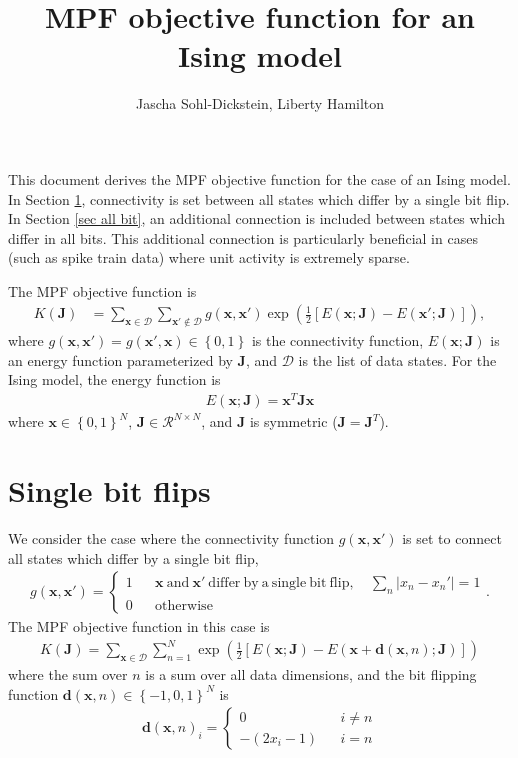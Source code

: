 \documentclass{article}
\title{MPF objective function for an Ising model}
\author{
Jascha Sohl-Dickstein, Liberty Hamilton
}
\newcommand{\mb}{\mathbf}
\begin{document}
\maketitle

This document derives the MPF objective function for the case of an Ising model.  In Section \ref{sec single bit}, connectivity is set between all states which differ by a single bit flip.  In Section \ref{sec all bit}, an additional connection is included between states which differ in all bits.  This additional connection is particularly beneficial in cases (such as spike train data) where unit activity is extremely sparse.

The MPF objective function is
\begin{align}
K\left( \mb J \right) & = \sum_{\mb x \in \mathcal D} \sum_{\mb x' \notin \mathcal D} g\left( \mb x, \mb x' \right) \exp\left( \frac{1}{2}\left[
E(\mb x; \mb J ) - E(\mb x'; \mb J) \right] \right)
,
\end{align}
where $g\left( \mb x, \mb x' \right) = g\left( \mb x', \mb x \right) \in \left\{ 0, 1 \right\}$ is the connectivity function, $E(\mb x; \mb J )$ is an energy function parameterized by $\mb J$, and $\mathcal D$ is the list of data states.  For the Ising model, the energy function is
\begin{align}
E\left( \mb x; \mb J\right) = \mb x^T \mb J \mb x
\end{align}
where $\mb x \in \left\{ 0, 1 \right\}^N$, $\mb J \in \mathcal R^{N\times N}$, and $\mb J$ is symmetric ($\mb J = \mb J^T$).

\section{Single bit flips}\label{sec single bit}

We consider the case where the connectivity function $g\left( \mb x, \mb x' \right)$ is set to connect all states which differ by a single bit flip,
\begin{align}
g\left( \mb x, \mb x' \right)
 =
	\left\{\begin{array}{ccrl}
1 & & \mb x \mathrm{\ and\ } \mb x' \mathrm{\ differ\ by\ a\ single\ bit\ flip,\ }  & \sum_n \left| x_n - x_n' \right| = 1  \\
0 & & \mathrm{otherwise} & 
	\end{array}\right.
\label{trans}
.
\end{align}
The MPF objective function in this case is
\begin{align}
K\left( \mb J \right) = \sum_{\mb x \in \mathcal D} \sum_{n=1}^N \exp\left( \frac{1}{2}\left[
E(\mb x; \mb J) - E(\mb x + {\mb d}(\mb x, n); \mb J) \right] \right)
\end{align}
where the sum over $n$ is a sum over all data dimensions, and the bit flipping function ${\mb d}(\mb x, n) \in \left\{ -1, 0, 1 \right\}^N$ is
\begin{align}
{\mb d}(\mb x, n)_i =
	\left\{\begin{array}{ccc}
0 & & i \neq n \\
-(2 x_i - 1) & & i = n
	\end{array}\right.
\end{align}
\end{document}
